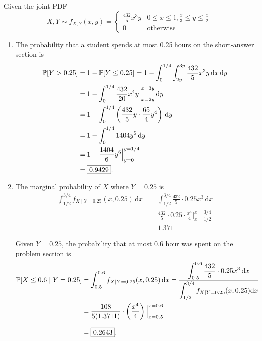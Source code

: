 \begin{solution}
    Given the joint PDF
    \[
        X,Y \sim f_{X,Y}(x,y) = \begin{cases}
            \displaystyle \frac{432}{5} x^3 y & 0 \leq x \leq 1, \frac{x}{3} \leq y \leq \frac{x}{2}\\
            0 & \text{otherwise}
        \end{cases}
    \]
    \begin{enumerate}
        \item The probability that a student spends at most 0.25 hours on the short-answer section is
        \begin{align*}
            \mathbb{P}[Y > 0.25] &= 1 - \mathbb{P}[Y \leq 0.25]
            = 1 - \int^{1/4}_0 \int^{3y}_{2y} \frac{432}{5} x^3 y \, \mathrm{d}x \, \mathrm{d}y\\
            &= 1 - \int^{1/4}_0 \frac{432}{20} x^4y \Big|^{x=3y}_{x=2y} \, \mathrm{d}y\\
            &= 1 - \int^{1/4}_0 \left( \frac{432}{5}y \cdot \frac{65}{4}y^4 \right) \, \mathrm{d}y\\
            &= 1 - \int^{1/4}_0 1404y^5 \, \mathrm{d}y\\
            &= 1 - \frac{1404}{6}y^6 \Big|^{y=1/4}_{y=0}\\
            &= \fbox{$0.9429$}.
        \end{align*}

        \item The marginal probability of $X$ where $Y = 0.25$ is 
        \begin{align*}
            \int^{3/4}_{1/2} f_{X \mid Y = 0.25} (x, 0.25) \, \mathrm{d}x 
            &= \int^{3/4}_{1/2} \frac{432}{5} \cdot 0.25x^3 \, \mathrm{d}x\\
            &= \frac{432}{5} \cdot 0.25 \cdot \frac{x^4}{4} \Big|^{x=3/4}_{x=1/2}\\
            &= 1.3711
        \end{align*}

        Given $Y =0.25$, the probability that at most 0.6 hour was spent on the problem section is
        \begin{align*}
            \mathbb{P}[X \leq 0.6 \mid Y = 0.25] &= \int^{0.6}_{0.5} f_{X \mid Y = 0.25} (x, 0.25) \, \mathrm{d}x
            = \frac{\displaystyle \int^{0.6}_{0.5} \frac{432}{5} \cdot 0.25x^3 \, \mathrm{d}x}{\displaystyle \int^{3/4}_{1/2} f_{X \mid Y = 0.25}(x, 0.25) \mathrm{d}x}\\
            &= \frac{108}{5 (1.3711)} \cdot \left( \frac{x^4}{4} \right)\Big|^{x=0.6}_{x=0.5}\\[0.7em]
            &= \fbox{$0.2643$}.
        \end{align*}


\end{enumerate}
\end{solution}
